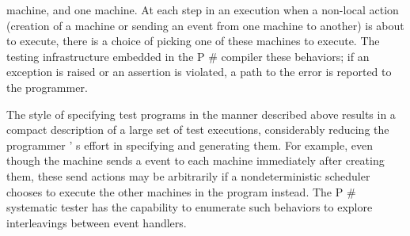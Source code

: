 \documentclass{article}
\begin{document}
\begin{mdDiv}[class={body,madoko},elem={body},line-adjust={0}]
\begin{mdP}[data-line={686}]
{}%
{} machine, and one %
{}%
{} machine.
At each step in an execution when a non-local action (creation of a machine or
sending an event from one machine to another) is about to execute, there is a choice
of picking %
{}%
{} one of these machines to execute. 
The testing infrastructure embedded in the P%
{}\#%
{} compiler %
{}%
{}
these behaviors; if an exception is raised or an assertion is violated, a path to
the error is reported to the programmer.%
\end{mdP}%
\begin{mdP}[class={indent},data-line={697}]%
{}The style of specifying test programs in the manner described above results in a
compact description of a large set of test executions, considerably reducing the
programmer%
{}{'}%
{}s effort in specifying and generating them.
For example, even though the %
{}%
{} machine sends a %
{}%
{} event to each %
{}%
{}
machine immediately after creating them, these send actions may be arbitrarily
{}%
{} if a nondeterministic scheduler chooses to execute the other machines 
in the program instead. The P%
{}\#%
{} systematic tester has the capability to enumerate
such behaviors to explore %
{}%
{} interleavings between event handlers.%
\end{mdP}%
\end{mdDiv}
\end{document}
